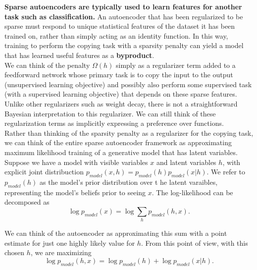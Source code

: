 \documentclass[11pt]{article}
\begin{document}
\textbf{Sparse autoencoders are typically used to learn features for another task such as classification.} An autoencoder that has been regularized to be sparse must respond to unique statistical features of the dataset it has been trained on, rather than simply acting as an identity function. In this way, training to perform the copying task with a sparsity penalty can yield a model that has learned useful features as a \textbf{byproduct}.\\


We can think of the penalty \(\Omega(h)\) simply as a regularizer term added to a feedforward network whose primary task is to copy the input to the output (unsupervised learning objective) and possibly also perform some supervised task (with a supervised learning objective) that depends on these sparse features. Unlike other regularizers such as weight decay, there is not a straightforward Bayesian interpretation to this regularizer. We can still think of these regularization terms as implicitly expressing a preference over functions.\\


Rather than thinking of the sparsity penalty as a regularizer for the copying task, we can think of the entire sparse autoencoder framework as approximating maximum likelihood training of a generative model that has latent variables.\\


Suppose we have a model with visible variables \(x\) and latent variables \(h\), with explicit joint distribuction \(p_{model}(x,h) = p_{model}(h)p_{model}(x|h)\). We refer to \(p_{model}(h)\) as the model's prior distribution over t he latent varaibles, representing the model's beliefs prior to seeing \(x\). The log-likelihood can be decomposed as\\
\begin{equation}
\log p_{model}(x) = \log \sum_h p_{model}(h,x).
\end{equation}

We can think of the autoencoder as approximating this sum with a point estimate for just one highly likely value for \(h\). From this point of view, with this chosen \(h\), we are maximizing\\
\begin{equation}
\log p_{model}(h,x) = \log p_{model}(h) + \log p_{model}(x|h).
\end{equation}
\end{document}
